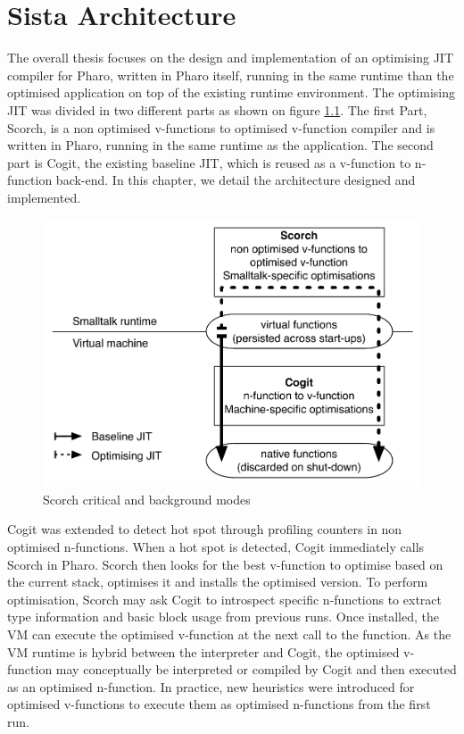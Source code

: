 \documentclass[a4paper,12pt,twoside]{../includes/ThesisStyle}
\begin{document}
\fi

\chapter{Sista Architecture}
\label{chap:architecture}
\minitoc

The overall thesis focuses on the design and implementation of an optimising JIT compiler for Pharo, written in Pharo itself, running in the same runtime than the optimised application on top of the existing runtime environment. The optimising JIT was divided in two different parts as shown on figure \ref{fig:OptArchitecture}. The first Part, Scorch, is a non optimised v-functions to optimised v-function compiler and is written in Pharo, running in the same runtime as the application. The second part is Cogit, the existing baseline JIT, which is reused as a v-function to n-function back-end. In this chapter, we detail the architecture designed and implemented.

\begin{figure}[h!]
    \begin{center}
        \includegraphics[width=0.8\linewidth]{OptArchitecture}
        \caption{Scorch critical and background modes}
        \label{fig:OptArchitecture}
    \end{center}
\end{figure}

Cogit was extended to detect hot spot through profiling counters in non optimised n-functions. When a hot spot is detected, Cogit immediately calls Scorch in Pharo. Scorch then looks for the best v-function to optimise based on the current stack, optimises it and installs the optimised version. To perform optimisation, Scorch may ask Cogit to introspect specific n-functions to extract type information and basic block usage from previous runs. Once installed, the VM can execute the optimised v-function at the next call to the function. As the VM runtime is hybrid between the interpreter and Cogit, the optimised v-function may conceptually be interpreted or compiled by Cogit and then executed as an optimised n-function. In practice, new heuristics were introduced for optimised v-functions to execute them as optimised n-functions from the first run.
\end{document}
